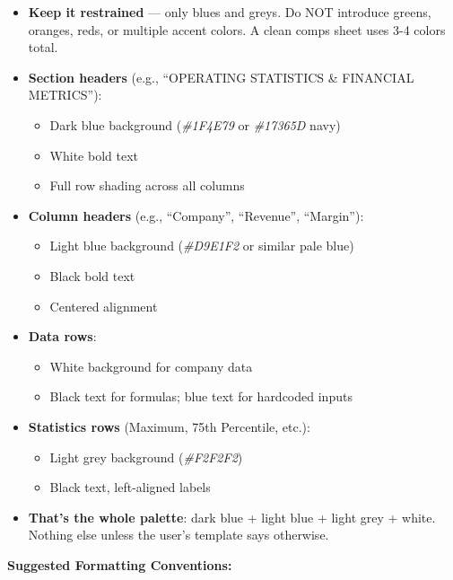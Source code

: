 \documentclass[11pt]{article}
\begin{document}
\begin{itemize}[leftmargin=*,itemsep=2pt,topsep=2pt]
\item {} \textbf{Keep it restrained} — only blues and greys. Do NOT introduce greens, oranges, reds, or multiple accent colors. A clean comps sheet uses 3-4 colors total.
\item {} \textbf{Section headers} (e.g., ``OPERATING STATISTICS \& FINANCIAL METRICS''):
\begin{itemize}[leftmargin=*,itemsep=2pt,topsep=2pt]
\item {} Dark blue background (\emph{\#1F4E79} or \emph{\#17365D} navy)
\item {} White bold text
\item {} Full row shading across all columns
\end{itemize}
\item {} \textbf{Column headers} (e.g., ``Company'', ``Revenue'', ``Margin''):
\begin{itemize}[leftmargin=*,itemsep=2pt,topsep=2pt]
\item {} Light blue background (\emph{\#D9E1F2} or similar pale blue)
\item {} Black bold text
\item {} Centered alignment
\end{itemize}
\item {} \textbf{Data rows}:
\begin{itemize}[leftmargin=*,itemsep=2pt,topsep=2pt]
\item {} White background for company data
\item {} Black text for formulas; blue text for hardcoded inputs
\end{itemize}
\item {} \textbf{Statistics rows} (Maximum, 75th Percentile, etc.):
\begin{itemize}[leftmargin=*,itemsep=2pt,topsep=2pt]
\item {} Light grey background (\emph{\#F2F2F2})
\item {} Black text, left-aligned labels
\end{itemize}
\item {} \textbf{That's the whole palette}: dark blue + light blue + light grey + white. Nothing else unless the user's template says otherwise.
\end{itemize}

\textbf{Suggested Formatting Conventions:}
\end{document}
